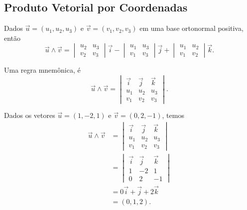 \subsection{Produto Vetorial por Coordenadas}\label{cap_prodvet_sec_coord}

Dados $\vec{u} = (u_1,u_2,u_3)$ e $\vec{v} = (v_1,v_2,v_3)$ em uma base ortonormal positiva, então
\begin{equation}
  \vec{u}\land\vec{v} =
  \begin{vmatrix}
    u_2 & u_3\\
    v_2 & v_3
  \end{vmatrix}\vec{i} -
  \begin{vmatrix}
    u_1 & u_3\\
    v_1 & v_3
  \end{vmatrix}\vec{j} +
  \begin{vmatrix}
    u_1 & u_2 \\
    v_1 & v_2
  \end{vmatrix}\vec{k}.
\end{equation}

\begin{obs}
  Uma regra mnemônica, é
  \begin{equation}
    \vec{u}\land\vec{v} =
    \begin{vmatrix}
      \vec{i} & \vec{j} & \vec{k} \\
      u_1 & u_2 & u_3 \\
      v_1 & v_2 & v_3
    \end{vmatrix}.
  \end{equation}
\end{obs}

\begin{ex}
  Dados os vetores $\vec{u} = (1,-2,1)$ e $\vec{v} = (0,2,-1)$, temos
  \begin{align}
    \vec{u}\land\vec{v} &=
                          \begin{vmatrix}
                            \vec{i} & \vec{j} & \vec{k} \\
                            u_1 & u_2 & u_3 \\
                            v_1 & v_2 & v_3
                          \end{vmatrix} \\
                        &=
                          \begin{vmatrix}
                            \vec{i} & \vec{j} & \vec{k} \\
                            1       & -2      & 1 \\
                            0       & 2       & -1
                          \end{vmatrix} \\
                        &= 0\vec{i} + \vec{j} + 2\vec{k}\\
                        &= (0,1,2).
  \end{align}
\end{ex}

